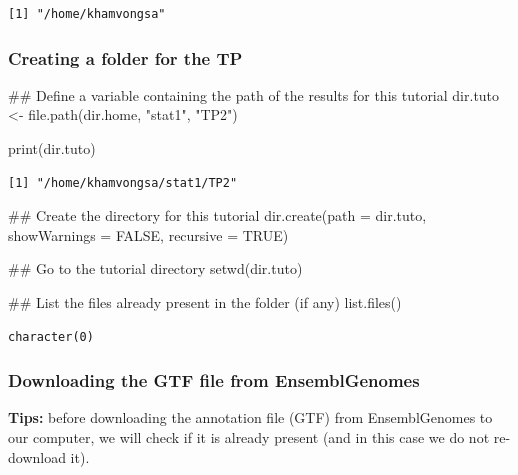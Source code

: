 \documentclass[]{article}
\newenvironment{Shaded}{\begin{snugshade}}{\end{snugshade}}
\newcommand{\KeywordTok}[1]{\textcolor[rgb]{0.94,0.87,0.69}{#1}}
\newcommand{\DataTypeTok}[1]{\textcolor[rgb]{0.87,0.87,0.75}{#1}}
\newcommand{\StringTok}[1]{\textcolor[rgb]{0.80,0.58,0.58}{#1}}
\newcommand{\OtherTok}[1]{\textcolor[rgb]{0.94,0.94,0.56}{#1}}
\newcommand{\NormalTok}[1]{\textcolor[rgb]{0.80,0.80,0.80}{#1}}
\begin{document}
\begin{verbatim}
[1] "/home/khamvongsa"
\end{verbatim}

\subsubsection{Creating a folder for the
TP}\label{creating-a-folder-for-the-tp}

\begin{Shaded}
\begin{Highlighting}[]
\NormalTok{## Define a variable containing the path of the results for this tutorial}
\NormalTok{dir.tuto <-}\StringTok{ }\KeywordTok{file.path}\NormalTok{(dir.home, }\StringTok{"stat1"}\NormalTok{, }\StringTok{"TP2"}\NormalTok{)}

\KeywordTok{print}\NormalTok{(dir.tuto)}
\end{Highlighting}
\end{Shaded}

\begin{verbatim}
[1] "/home/khamvongsa/stat1/TP2"
\end{verbatim}

\begin{Shaded}
\begin{Highlighting}[]
\NormalTok{## Create the directory for this tutorial}
\KeywordTok{dir.create}\NormalTok{(}\DataTypeTok{path =}\NormalTok{ dir.tuto, }\DataTypeTok{showWarnings =} \OtherTok{FALSE}\NormalTok{, }\DataTypeTok{recursive =} \OtherTok{TRUE}\NormalTok{)}

\NormalTok{## Go to the tutorial directory}
\KeywordTok{setwd}\NormalTok{(dir.tuto)}

\NormalTok{## List the files already present in the folder (if any)}
\KeywordTok{list.files}\NormalTok{()}
\end{Highlighting}
\end{Shaded}

\begin{verbatim}
character(0)
\end{verbatim}

\subsubsection{Downloading the GTF file from
EnsemblGenomes}\label{downloading-the-gtf-file-from-ensemblgenomes}

\textbf{Tips: } before downloading the annotation file (GTF) from
EnsemblGenomes to our computer, we will check if it is already present
(and in this case we do not re-download it).
\end{document}
